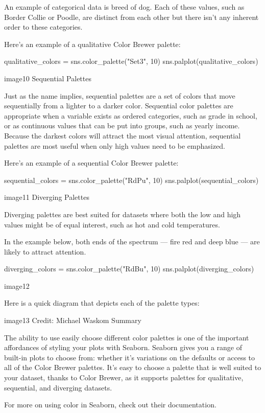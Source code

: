 \documentclass{journal}
\begin{document}
An example of categorical data is breed of dog. Each of these values, such as Border Collie or Poodle, are distinct from each other but there isn’t any inherent order to these categories.

Here’s an example of a qualitative Color Brewer palette:

qualitative_colors = sns.color_palette("Set3", 10)
sns.palplot(qualitative_colors)

image10
Sequential Palettes

Just as the name implies, sequential palettes are a set of colors that move sequentially from a lighter to a darker color. Sequential color palettes are appropriate when a variable exists as ordered categories, such as grade in school, or as continuous values that can be put into groups, such as yearly income. Because the darkest colors will attract the most visual attention, sequential palettes are most useful when only high values need to be emphasized.

Here’s an example of a sequential Color Brewer palette:

sequential_colors = sns.color_palette("RdPu", 10)
sns.palplot(sequential_colors)

image11
Diverging Palettes

Diverging palettes are best suited for datasets where both the low and high values might be of equal interest, such as hot and cold temperatures.

In the example below, both ends of the spectrum — fire red and deep blue — are likely to attract attention.

diverging_colors = sns.color_palette("RdBu", 10)
sns.palplot(diverging_colors)

image12

Here is a quick diagram that depicts each of the palette types:

image13
Credit: Michael Waskom
Summary

The ability to use easily choose different color palettes is one of the important affordances of styling your plots with Seaborn. Seaborn gives you a range of built-in plots to choose from: whether it’s variations on the defaults or access to all of the Color Brewer palettes. It’s easy to choose a palette that is well suited to your dataset, thanks to Color Brewer, as it supports palettes for qualitative, sequential, and diverging datasets.

For more on using color in Seaborn, check out their documentation.
\end{document}
